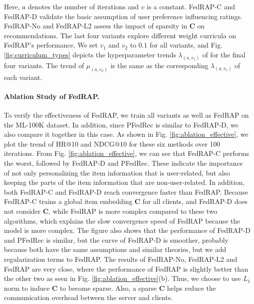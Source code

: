 \documentclass{article} %
\begin{document}
Here, $a$ denotes the number of iterations and $v$ is a constant. FedRAP-C and FedRAP-D validate the basic assumption of user preference influencing ratings. FedRAP-No and FedRAP-L2 assess the impact of sparsity in $\mathbf{C}$ on recommendations. The last four variants explore different weight curricula on FedRAP's performance. We set $v_1$ and $v_2$ to $0.1$ for all variants, and Fig. \ref{fig:curriculum_types} depicts the hyperparameter trends $\lambda_{(a,v_1)}$ of for the final four variants. The trend of $\mu_{(a,v_2)}$ is the same as the corresponding $\lambda_{(a,v_1)}$ of each variant.

\paragraph{Ablation Study of FedRAP.}
To verify the effectiveness of FedRAP, we train all variants as well as FedRAP on the ML-100K dataset. 
In addition, since PFedRec is similar to FedRAP-D, we also compare it together in this case. 
As shown in Fig. \ref{fig:ablation_effective}, we plot the trend of HR@10 and NDCG@10 for these six methods over 100 iterations.
From Fig. \ref{fig:ablation_effective}, we can see that FedRAP-C performs the worst, followed by FedRAP-D and PFedRec.
These indicate the importance of not only personalizing the item information that is user-related, but also keeping the parts of the item information that are non-user-related.
In addition, both FedRAP-C and FedRAP-D reach convergence faster than FedRAP. Because FedRAP-C trains a global item embedding $\mathbf{C}$ for all clients, and FedRAP-D does not consider $\mathbf{C}$, while FedRAP is more complex compared to these two algorithms, which explains the slow convergence speed of FedRAP because the model is more complex.
The figure also shows that the performance of FedRAP-D and PFedRec is similar, but the curve of FedRAP-D is smoother, probably because both have the same assumptions and similar theories, but we add regularization terms to FedRAP.
The results of FedRAP-No, FedRAP-L2 and FedRAP are very close, where the performance of FedRAP is slightly better than the other two as seen in Fig. \ref{fig:ablation_effective}(b).
Thus, we choose to use $L_1$ norm to induce $\mathbf{C}$ to become sparse. Also, a sparse $\mathbf{C}$ helps reduce the communication overhead between the server and clients.
\end{document}
